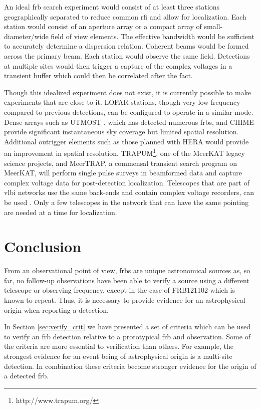\documentclass[a4paper,fleqn,usenatbib]{mnras}
\begin{document}
An ideal \gls{frb} search experiment would consist of at least three stations
geographically separated to reduce common \gls{rfi} and allow for localization.
Each station would consist of an aperture array or a compact array of
small-diameter/wide field of view elements. The effective bandwidth would be
sufficient to accurately determine a dispersion relation.  Coherent beams would
be formed across the primary beam. Each station would observe the same field.
Detections at multiple sites would then trigger a capture of the complex
voltages in a transient buffer which could then be correlated after the fact. 

Though this idealized experiment does not exist, it is currently possible to
make experiments that are close to it. LOFAR stations, though very low-frequency
compared to previous detections, can be configured to operate in a similar mode.
Dense arrays such as UTMOST \citep{2017MNRAS.468.3746C}, which has detected
numerous \glspl{frb}, and CHIME \citep{Chime2018} provide significant
instantaneous sky coverage but limited spatial resolution. Additional outrigger
elements such as those planned with HERA \citep{2017PASP..129d5001D} would
provide an improvement in spatial resolution.
TRAPUM\footnote{http://www.trapum.org/}, one of the MeerKAT legacy science
projects,  and MeerTRAP, a commensal transient search program on MeerKAT, will
perform single pulse surveys in beamformed data and capture complex voltage data
for post-detection localization.  Telescopes that are part of \gls{vlbi}
networks use the same back-ends and contain complex voltage recorders, can be
used \citep{2018arXiv180401904W}. Only a few telescopes in the network that can
have the same pointing are needed at a time for localization.

\section{Conclusion}

From an observational point of view, \glspl{frb} are unique astronomical sources
as, so far, no follow-up observations have been able to verify a source using a
different telescope or observing frequency, except in the case of FRB121102
which is known to repeat. Thus, it is necessary to provide evidence for an
astrophysical origin when reporting a detection.

In Section \ref{sec:verify_crit} we have presented a set of criteria which can
be used to verify an \gls{frb} detection relative to a prototypical \gls{frb}
and observation. Some of the criteria are more essential to verification than
others.  For example, the strongest evidence for an event being of astrophysical
origin is a multi-site detection.  In combination these criteria become stronger
evidence for the origin of a detected \gls{frb}.
\end{document}
